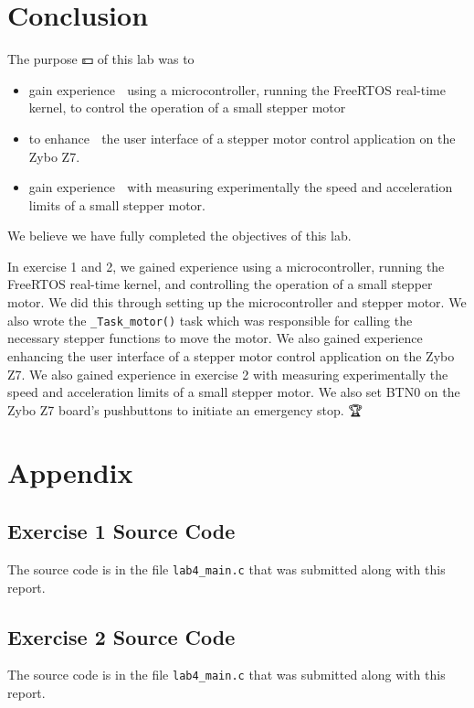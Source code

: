 \documentclass[11pt, letterpaper, titlepage]{article}
\begin{document}
\section{Conclusion}
The purpose 💵 of this lab was to 
\begin{itemize}
  \item gain experience 🚀 using a microcontroller, running the FreeRTOS real-time kernel, to control the operation of a small stepper motor
  \item to enhance 🚀 the user interface of a stepper motor control application on the Zybo Z7.
  \item gain experience 🚀 with measuring experimentally the speed and acceleration limits of a small stepper motor.
\end{itemize}

We believe we have fully completed the objectives of this lab. 🎯

In exercise 1 and 2, we gained experience using a microcontroller, running the FreeRTOS real-time kernel, and controlling the operation of a small stepper motor. We did this through setting up the microcontroller and stepper motor. We also wrote the \texttt{_Task_motor()} task which was responsible for calling the necessary stepper functions to move the motor. We also gained experience enhancing the user interface of a stepper motor control application on the Zybo Z7. We also gained experience in exercise 2 with measuring experimentally the speed and acceleration limits of a small stepper motor. We also set BTN0 on the Zybo Z7 board's pushbuttons to initiate an emergency stop. 🏆

\section{Appendix}

\subsection{Exercise 1 Source Code}
The source code is in the file \texttt{lab4_main.c} that was submitted along with this report. 🚰

\subsection{Exercise 2 Source Code}
The source code is in the file \texttt{lab4_main.c} that was submitted along with this report. 🧀
\end{document}
